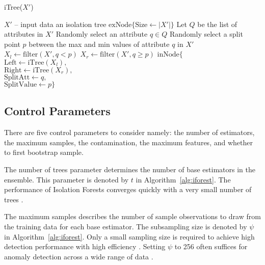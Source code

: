 \documentclass[10pt, conference]{IEEEtran}
\begin{document}
\begin{algorithm}[H]
	\caption{iTree($X'$)}
	\label{alg:itree}
	\begin{algorithmic}[1]
		\Require $X'$ -- input data  
		\Ensure an isolation tree
		\Return $\text{exNode}\{\text{Size} \leftarrow |X'|\}$
		\Else
		\State Let $Q$ be the list of attributes in $X'$
		\State Randomly select an attribute $q \in Q$
		\State Randomly select a split point $p$ between the max and min values of attribute $q$ in $X'$
		\State $X_l \gets \text{filter}(X', q < p)$
		\State $X_r \gets \text{filter}(X', q \ge p)$
		\Return $\text{inNode}\{$ \\
		\hspace*{1.5em} $\text{Left} \leftarrow \text{iTree}(X_l),$ \\
		\hspace*{1.5em} $\text{Right} \leftarrow \text{iTree}(X_r),$ \\
		\hspace*{1.5em} $\text{SplitAtt} \leftarrow q,$ \\
		\hspace*{1.5em} $\text{SplitValue} \leftarrow p\}$ 
		\EndIf
	\end{algorithmic}
\end{algorithm}




\subsection{Control Parameters}
There are five control parameters to consider namely: the number of estimators, the maximum samples, the contamination, the maximum features, and whether to first bootstrap sample.

The number of trees parameter determines the number of base estimators in the ensemble. This parameter is denoted by $t$ in Algorithm~\ref{alg:iforest}. The performance of Isolation Forests converges quickly with a very small number of trees \cite{iforest}.


The maximum samples describes the number of sample observations to draw from the training data for each base estimator. The subsampling size is denoted by $\psi$ in Algorithm~\ref{alg:iforest}. Only a small sampling size is required to achieve high detection performance with high efficiency \cite{iforest}. Setting $\psi$ to 256 often suffices for anomaly detection across a wide range of data \cite{iforest2}.
\end{document}
